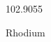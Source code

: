 \documentclass[12pt]{article}
\begin{document}
\hfill{}
\vfill
\begin{center}
  {\fontsize{50}{60}
  }

  102.9055

Rhodium
\end{center}
\vfill
\end{document}
